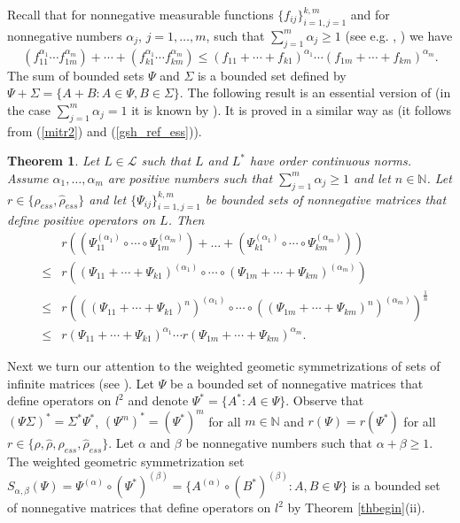 \documentclass[12pt, reqno]{amsart}
\newtheorem{theorem}{Theorem}[section]
\theoremstyle{definition}
\theoremstyle{remark}
\numberwithin{equation}{section}
\newcommand{\be}{\begin{equation}}
\newcommand{\ee}{\end{equation}}
\newcommand{\NN}{\mathbb{N}}
\begin{document}
Recall that for nonnegative measurable functions $\{f _{i j}\}_{i=1, j=1}^{k, m}$ and for nonnegative numbers  $\alpha_j$, $j=1, \ldots , m$,   such that $\sum _{j=1} ^m \alpha _j \ge 1$ (see e.g. \cite{Mi}, \cite{BP22b}) we have 
\be
(f_{11}^{\alpha _1} \cdots f_{1m}^{\alpha _m})+\cdots+(f_{k1}^{\alpha _1} \cdots f_{km}^{\alpha _m}) \le (f_{11}+\cdots+f_{k1})^{\alpha _1} \cdots (f_{1m}+\cdots+f_{km})^{\alpha _m}.
\label{mitr2}
\ee
The sum of bounded sets $\Psi$ and $\Sigma$ is a bounded set defined by
$\Psi + \Sigma =\{A+B: A \in \Psi, B \in \Sigma\}$. The following result is an essential version of 
 \cite[Theorem 3.7(ii)]{BP22b} (in the case $\sum_{j=1}^{m} \alpha _j= 1$ it is known by  \cite[Theorem 3.7(i)]{BP22b}).  It is proved in a similar way as  \cite[Theorem 3.7]{BP22b} (it follows from (\ref{mitr2}) and (\ref{gsh_ref_ess})). %
\begin{theorem}
\label{finally2_ess}
Let $L\in \mathcal{L}$ such that %
$L$ and $L^*$ have order continuous norms. 
 Assume $\alpha _1, \ldots , \alpha _m$ are  positive numbers such that $\sum_{j=1}^{m} \alpha _j\ge 1$ and let $n \in \NN$.  Let  $r\in \{ \rho _{ess}, \hat{\rho} _{ess}\}$  and let  $\{\Psi_{i j}\}_{i=1, j=1}^{k, m}$ be bounded sets of nonnegative matrices that define positive operators on $L$. Then
\begin{eqnarray}
\nonumber
& & r \left(\left(\Psi_{1 1}^{(\alpha _1)} \circ \cdots \circ \Psi_{1 m}^{(\alpha _m)}\right) + \ldots + \left(\Psi_{k 1}^{(\alpha _1)} \circ \cdots \circ \Psi_{k m}^{(\alpha _m)} \right) \right) \\
\nonumber
& \le &r \left((\Psi_{1 1}+ \cdots  + \Psi_{k 1})^{(\alpha _1)} \circ \cdots
\circ (\Psi_{1 m} + \cdots  + \Psi_{k m})^{(\alpha _m)}\right)\\
\nonumber
& \le &r \left(((\Psi_{1 1} + \cdots  + \Psi_{k 1})^n)^{(\alpha _1)} \circ \cdots
\circ ((\Psi_{1 m} + \cdots + \Psi_{k m})^n)^{(\alpha _m)}\right)^{\frac{1}{n}}\\
&\le&r \left( \Psi_{1 1} + \cdots  + \Psi_{k 1} \right)^{\alpha _1} \cdots
r \left( \Psi_{1 m} + \cdots  + \Psi_{k m}\right)^{\alpha _m} .
\label{lepa2_ess}
\end{eqnarray}
\end{theorem}
Next we turn our attention to the weighted geometic symmetrizations of sets of infinite matrices (see \cite{BP22b}). 
Let $\Psi$ be a bounded set of nonnegative matrices that define operators on $l^2$ and denote $\Psi ^* =\{A^* : A \in \Psi\}$. Observe that $(\Psi \Sigma)^*= \Sigma ^* \Psi ^*$, $(\Psi ^m)^* = (\Psi ^*)^m$ for all $m \in \NN$ and $r(\Psi)=r(\Psi^*)$ for all $r\in \{ \rho , \hat{\rho} , \rho _{ess}, \hat{\rho} _{ess}\}$. Let $\alpha$ and $\beta$ be nonnegative numbers such that $\alpha+\beta \ge 1$. 
The weighted geometric symmetrization set $S_{\alpha, \beta}(\Psi)=\Psi^{(\alpha)}\circ(\Psi^*)^{(\beta)}=\{A^{(\alpha)}\circ (B^*)^{(\beta)} : A, B \in \Psi\}$ is a bounded set of nonnegative matrices that define operators on $l^2$ by Theorem \ref{thbegin}(ii). 
\end{document}
